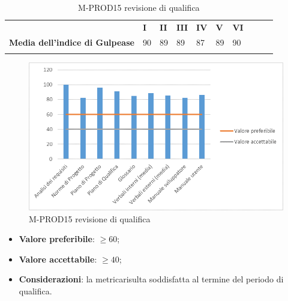 \pagebreak
\begin{longtable} {						
		>{}p{70mm}  		
		>{}p{8mm}		
		>{}p{8mm}		
		>{}p{8mm}		
		>{}p{8mm}		
		>{}p{8mm}		
		>{}p{8mm}
		>{}p{8mm}
		>{}p{8mm}
		>{}p{8mm}				
	}			
	\rowcolor{gray!50}
	\textbf{} & \textbf{I} & \textbf{II} & \textbf{III} & \textbf{IV} & \textbf{V} & \textbf{VI} \TBstrut \\ [2mm]
	\textbf{Media dell'indice di Gulpease} & 90 & 89 & 89 & 87 & 89 & 90 \TBstrut \\ [2mm]
	\rowcolor{white}
	\caption{M-PROD15 revisione di qualifica}
\end{longtable}
\begin{figure}[H] 	
	\includegraphics[width=\linewidth]{./img/grafici/RQ15b.png}	
	\caption{M-PROD15 revisione di qualifica}	
\end{figure}
\begin{itemize}
	\item \textbf{Valore preferibile}: $\ge60$;
	\item \textbf{Valore accettabile}: $\ge40$;
	\item \textbf{Considerazioni}: la metrica\glosp risulta soddisfatta al termine del periodo di qualifica.
\end{itemize}

